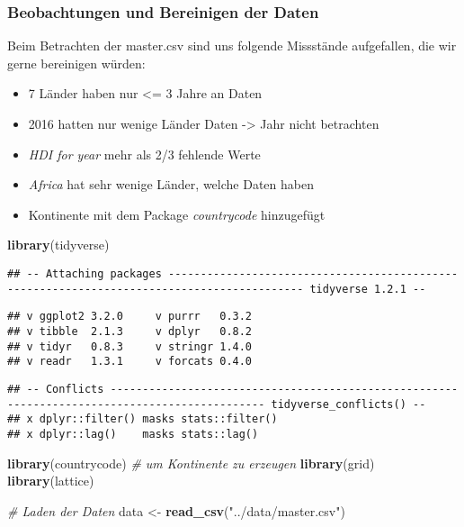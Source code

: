 \documentclass[]{article}
\newenvironment{Shaded}{\begin{snugshade}}{\end{snugshade}}
\newcommand{\CommentTok}[1]{\textcolor[rgb]{0.56,0.35,0.01}{\textit{#1}}}
\newcommand{\KeywordTok}[1]{\textcolor[rgb]{0.13,0.29,0.53}{\textbf{#1}}}
\newcommand{\NormalTok}[1]{#1}
\newcommand{\StringTok}[1]{\textcolor[rgb]{0.31,0.60,0.02}{#1}}
\providecommand{\tightlist}{%
  \setlength{\itemsep}{0pt}\setlength{\parskip}{0pt}}
\begin{document}
\hypertarget{beobachtungen-und-bereinigen-der-daten}{%
\subsubsection{Beobachtungen und Bereinigen der
Daten}\label{beobachtungen-und-bereinigen-der-daten}}

Beim Betrachten der master.csv sind uns folgende Missstände aufgefallen,
die wir gerne bereinigen würden:

\begin{itemize}
\tightlist
\item
  7 Länder haben nur \textless{}= 3 Jahre an Daten
\item
  2016 hatten nur wenige Länder Daten -\textgreater{} Jahr nicht
  betrachten
\item
  \emph{HDI for year} mehr als 2/3 fehlende Werte
\item
  \emph{Africa} hat sehr wenige Länder, welche Daten haben
\item
  Kontinente mit dem Package \emph{countrycode} hinzugefügt
\end{itemize}

\begin{Shaded}
\begin{Highlighting}[]
\KeywordTok{library}\NormalTok{(tidyverse)}
\end{Highlighting}
\end{Shaded}

\begin{verbatim}
## -- Attaching packages ------------------------------------------------------------------------------------------- tidyverse 1.2.1 --
\end{verbatim}

\begin{verbatim}
## v ggplot2 3.2.0     v purrr   0.3.2
## v tibble  2.1.3     v dplyr   0.8.2
## v tidyr   0.8.3     v stringr 1.4.0
## v readr   1.3.1     v forcats 0.4.0
\end{verbatim}

\begin{verbatim}
## -- Conflicts ---------------------------------------------------------------------------------------------- tidyverse_conflicts() --
## x dplyr::filter() masks stats::filter()
## x dplyr::lag()    masks stats::lag()
\end{verbatim}

\begin{Shaded}
\begin{Highlighting}[]
\KeywordTok{library}\NormalTok{(countrycode)   }\CommentTok{# um Kontinente zu erzeugen}
\KeywordTok{library}\NormalTok{(grid)}
\KeywordTok{library}\NormalTok{(lattice)}


\CommentTok{# Laden der Daten}
\NormalTok{data <-}\StringTok{ }\KeywordTok{read_csv}\NormalTok{(}\StringTok{"../data/master.csv"}\NormalTok{)}
\end{Highlighting}
\end{Shaded}
\end{document}
